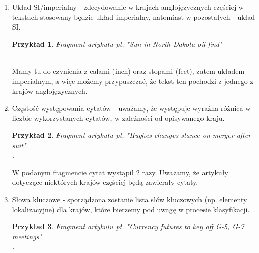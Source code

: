 \documentclass{classrep}
\newtheorem{exmp}{Przykład}[section]
\begin{document}
\begin{enumerate}
    \item Układ SI/imperialny - zdecydowanie w krajach anglojęzycznych częściej w tekstach stosowany będzie układ imperialny, natomiast w pozostałych - układ SI. \cite{reuters} \\
    \begin{exmp}Fragment artykułu pt. "Sun in North Dakota oil find" \cite{reuters} \\
		 \\
    \end{exmp}
    Mamy tu do czynienia z calami (inch) oraz stopami (feet), zatem układem imperialnym, a więc możemy przypuszczać, że tekst ten pochodzi z jednego z krajów anglojęzycznych. 
    \item Częstość występowania cytatów - uważamy, że występuje wyraźna różnica w liczbie wykorzystanych cytatów, w zależności od opisywanego kraju. \\
    \begin{exmp}Fragment artykułu pt. "Hughes changes stance on merger after suit" \cite{reuters} \\
		. \\
    \end{exmp}
    W podanym fragmencie cytat wystąpił 2 razy. Uważamy, że artykuły dotyczące niektórych krajów częściej będą zawierały cytaty.
    \item Słowa kluczowe - sporządzona zostanie lista słów kluczowych (np. elementy lokalizacyjne) dla krajów, które bierzemy pod uwagę w procesie klasyfikacji. \cite{reuters} \\
    \begin{exmp}Fragment artykułu pt. "Currency futures to key off G-5, G-7 meetings" \cite{reuters} \\
		. \\
    \end{exmp}

\end{enumerate}
\end{document}
